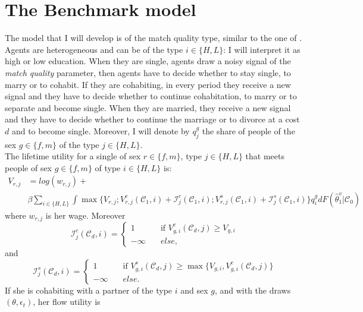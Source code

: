 \documentclass[12pt]{article}
\begin{document}
 \section{The Benchmark model}
 The model that I will develop is of the match quality type, similar to the one of \citet{jovanovic1979}.  Agents are heterogeneous and can be of the type $i \in \{H,L\}$: I will interpret it as high or low education. When they are single, agents draw a noisy signal of the \textit{match quality} parameter, then agents have to decide whether to stay single, to marry or to cohabit. If they are cohabiting, in every period they receive a new signal and they have to decide whether to continue cohabitation, to marry or to separate and become single. When they are married, they  receive a new signal and they have to decide whether to continue the marriage or to divorce at a cost $d$ and to become single. Moreover, I will denote by $q^g_{j}$ the share of people of the sex $g\in\{f,m\}$ of the type $j \in \{H,L\}$.\\
 The lifetime utility for a single of sex $r\in\{f,m\}$, type $j\in\{H,L\}$ that meets people of sex  $g\in\{f,m\}$ of type  $i\in\{H,L\}$ is:
 \begin{equation}\label{eq:vsi}
 \begin{split}
 V_{r,j}&=log(w_{r,j})+\\&\beta\sum_{i\in \{H,L\}}\int\max\bigg\{V_{r,j};V^{c}_{r,j}(\mathcal{C}_1,i)+\mathcal{I}_j^c(\mathcal{C}_1,i);V^{s}_{r,j}(\mathcal{C}_1,i)+\mathcal{I}_j^s(\mathcal{C}_1,i)\bigg\}q^{g}_i dF(\hat{\theta}_1^v|\mathcal{C}_0)
 \end{split}
 \end{equation}
 where $w_{r,j}$ is her wage. Moreover
 \begin{equation}
 \mathcal{I}^c_j(\mathcal{C}_d,i)=
 \begin{cases}
 1       & \quad \text{if }V^{c}_{g,i}(\mathcal{C}_d,j) \geq V_{g,i}\\
 -\infty  & \quad else,
 \end{cases}
 \end{equation}
 and
 \begin{equation}
 \mathcal{I}^s_j(\mathcal{C}_d,i)=
 \begin{cases}
 1       & \quad \text{if }V^{s}_{g,i}(\mathcal{C}_d,j) \geq\max\big\{V_{g,i},V^{c}_{g,i}(\mathcal{C}_d,j)\big\}\\
 -\infty  & \quad else.
 \end{cases}
 \end{equation}
 \newpage
 If she is cohabiting with a partner of the type $i$ and sex $g$, and with the draws $(\theta,\epsilon_t)$, her flow utility is
\end{document}
